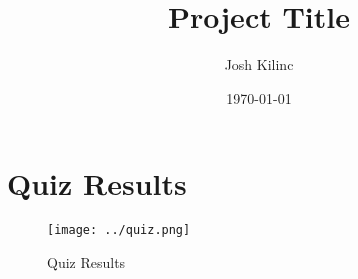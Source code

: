 \documentclass[11pt,a4paper]{sitshonours}
\title{Project Title}
\author{Josh Kilinc}
\date{\today}
\begin{document}
\maketitle

\newpage
\thispagestyle{plain}

\newpage
\begin{singlespacing}
    \tableofcontents
\end{singlespacing}
\setlength{\parskip}{1em}
\renewcommand{\baselinestretch}{2.0}

\newpage
{}
\setcounter{page}{1}
\onehalfspacing




\section{Quiz Results}
\begin{figure}[h]
    \centering
    \texttt{[image: ../quiz.png]}
    \caption{Quiz Results}
    \label{fig:quiz_results}
\end{figure}
\newpage
\singlespacing

\end{document}

